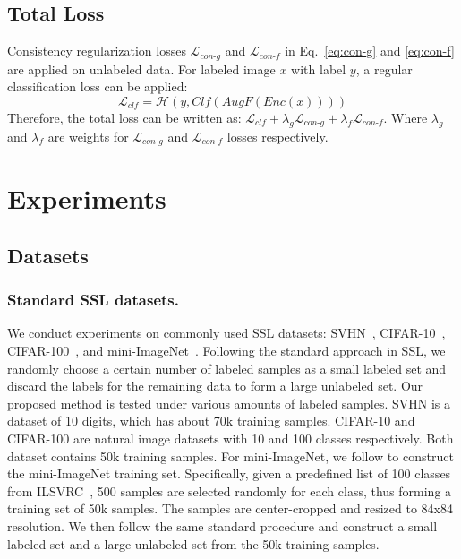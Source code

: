 \documentclass[runningheads]{llncs}
\begin{document}
\subsection{Total Loss}
Consistency regularization losses $\mathcal{L}_{con\text{-}g}$ and $\mathcal{L}_{con\text{-}f}$ in Eq.~\ref{eq:con-g} and \ref{eq:con-f} are applied on unlabeled data.
For labeled image $x$ with label $y$, a regular classification loss can be applied:
\begin{equation}\label{eq:clf}
    \mathcal{L}_{clf} = \mathcal{H}(y, Clf(AugF(Enc(x))))
\end{equation}
Therefore, the total loss can be written as: $\mathcal{L}_{clf} + \lambda_g\mathcal{L}_{con\text{-}g} + \lambda_f\mathcal{L}_{con\text{-}f}$.
Where $\lambda_g$ and $\lambda_f$ are weights for $\mathcal{L}_{con\text{-}g}$ and $\mathcal{L}_{con\text{-}f}$ losses respectively.



 \section{Experiments}
\subsection{Datasets}
\subsubsection{Standard SSL datasets.}
We conduct experiments on commonly used SSL datasets: SVHN~\cite{netzer2011reading}, CIFAR-10~\cite{krizhevsky2009learning}, CIFAR-100~\cite{krizhevsky2009learning}, and mini-ImageNet~\cite{ravi2016optimization}.
Following the standard approach in SSL, we randomly choose a certain number of labeled samples as a small labeled set and discard the labels for the remaining data to form a large unlabeled set.
Our proposed method is tested under various amounts of labeled samples.
SVHN is a dataset of 10 digits, which has about 70k training samples.
CIFAR-10 and CIFAR-100 are natural image datasets with 10 and 100 classes respectively.
Both dataset contains 50k training samples.
For mini-ImageNet, we follow \cite{iscen2019label,arazo2019pseudo} to construct the mini-ImageNet training set.
Specifically, given a predefined list of 100 classes~\cite{ravi2016optimization} from ILSVRC~\cite{russakovsky2015imagenet}, 500 samples are selected randomly for each class, thus forming a training set of 50k samples.
The samples are center-cropped and resized to 84x84 resolution.
We then follow the same standard procedure and construct a small labeled set and a large unlabeled set from the 50k training samples.
\end{document}
